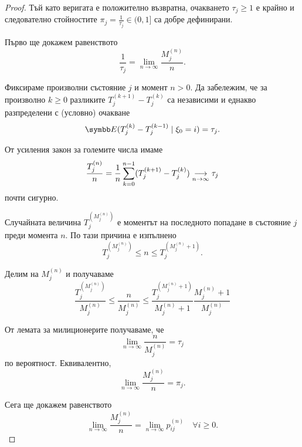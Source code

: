 \documentclass[numbers=endperiod, bibliography=totocnumbered]{scrartcl}
\begin{document}
\begin{proof}
  Тъй като веригата е положително възвратна, очакването \( \tau_j \geq 1 \) е крайно и следователно стойностите \( \pi_j = \frac 1 {\tau_j} \in (0, 1] \) са добре дефинирани.

  Първо ще докажем равенството
  \begin{equation*}
    \frac 1 {\tau_j}
    =
    \lim_{n \to \infty} \frac {M^{(n)}_j} n.
  \end{equation*}

  Фиксираме произволни състояние \( j \) и момент \( n > 0 \). Да забележим, че за произволно \( k \geq 0 \) разликите \( T_j^{(k+1)} - T_j^{(k)} \) са независими и еднакво разпределени с (условно) очакване
  \begin{equation*}
   \Expect(T_j^{(k)} - T_j^{(k-1)} \mid \xi_0 = i) = \tau_j.
  \end{equation*}

  От усиления закон за големите числа имаме
  \begin{equation*}
    \frac {T_j^{(n)}} n = \frac 1 n \sum_{k=0}^{n-1} (T_j^{(k+1)} - T_j^{(k)}) \Conv[n \to \infty]{} \tau_j
  \end{equation*}
  почти сигурно.

  Случайната величина \( T_j^{(M_j^{(n)})} \) е моментът на последното попадане в състояние \( j \) преди момента \( n \). По тази причина е изпълнено
  \begin{equation*}
    T_j^{(M_j^{(n)})} \leq n \leq T_j^{(M_j^{(n)} + 1)}.
  \end{equation*}

  Делим на \( M_j^{(n)} \) и получаваме
  \begin{equation*}
    \frac {T_j^{(M_j^{(n)})}} {M_j^{(n)}} \leq \frac n {M_j^{(n)}} \leq \frac {T_j^{(M_j^{(n)} + 1)}} {M_j^{(n)} + 1} \frac {M_j^{(n)} + 1} {M_j^{(n)}}
  \end{equation*}

  От лемата за милиционерите получаваме, че
  \begin{equation*}
    \lim_{n \to \infty} \frac n {M^{(n)}_j}
    =
    \tau_j
  \end{equation*}
  по вероятност. Еквивалентно,
  \begin{equation}\label{thm:ergodic_theorem/squeeze_lemma_application}
    \lim_{n \to \infty} \frac {M^{(n)}_j} n
    =
    \pi_j.
  \end{equation}

  Сега ще докажем равенството
  \begin{equation*}
    \lim_{n \to \infty} \frac {M^{(n)}_j} n
    =
    \lim_{n \to \infty} p_{ij}^{(n)} \quad\forall i \geq 0.
  \end{equation*}


\end{proof}
\end{document}
